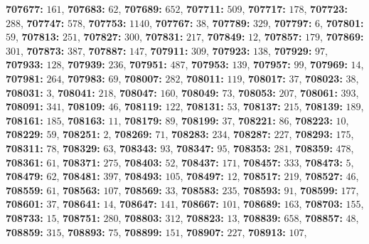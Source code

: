 \textsf{\bfseries 707677:} $161$, \textsf{\bfseries 707683:} $62$, \textsf{\bfseries 707689:} $652$, \textsf{\bfseries 707711:} $509$, \textsf{\bfseries 707717:} $178$, \textsf{\bfseries 707723:} $288$, \textsf{\bfseries 707747:} $578$, \textsf{\bfseries 707753:} $1140$, \textsf{\bfseries 707767:} $38$, \textsf{\bfseries 707789:} $329$, \textsf{\bfseries 707797:} $6$, \textsf{\bfseries 707801:} $59$, \textsf{\bfseries 707813:} $251$, \textsf{\bfseries 707827:} $300$, \textsf{\bfseries 707831:} $217$, \textsf{\bfseries 707849:} $12$, \textsf{\bfseries 707857:} $179$, \textsf{\bfseries 707869:} $301$, \textsf{\bfseries 707873:} $387$, \textsf{\bfseries 707887:} $147$, \textsf{\bfseries 707911:} $309$, \textsf{\bfseries 707923:} $138$, \textsf{\bfseries 707929:} $97$, \textsf{\bfseries 707933:} $128$, \textsf{\bfseries 707939:} $236$, \textsf{\bfseries 707951:} $487$, \textsf{\bfseries 707953:} $139$, \textsf{\bfseries 707957:} $99$, \textsf{\bfseries 707969:} $14$, \textsf{\bfseries 707981:} $264$, \textsf{\bfseries 707983:} $69$, \textsf{\bfseries 708007:} $282$, \textsf{\bfseries 708011:} $119$, \textsf{\bfseries 708017:} $37$, \textsf{\bfseries 708023:} $38$, \textsf{\bfseries 708031:} $3$, \textsf{\bfseries 708041:} $218$, \textsf{\bfseries 708047:} $160$, \textsf{\bfseries 708049:} $73$, \textsf{\bfseries 708053:} $207$, \textsf{\bfseries 708061:} $393$, \textsf{\bfseries 708091:} $341$, \textsf{\bfseries 708109:} $46$, \textsf{\bfseries 708119:} $122$, \textsf{\bfseries 708131:} $53$, \textsf{\bfseries 708137:} $215$, \textsf{\bfseries 708139:} $189$, \textsf{\bfseries 708161:} $185$, \textsf{\bfseries 708163:} $11$, \textsf{\bfseries 708179:} $89$, \textsf{\bfseries 708199:} $37$, \textsf{\bfseries 708221:} $86$, \textsf{\bfseries 708223:} $10$, \textsf{\bfseries 708229:} $59$, \textsf{\bfseries 708251:} $2$, \textsf{\bfseries 708269:} $71$, \textsf{\bfseries 708283:} $234$, \textsf{\bfseries 708287:} $227$, \textsf{\bfseries 708293:} $175$, \textsf{\bfseries 708311:} $78$, \textsf{\bfseries 708329:} $63$, \textsf{\bfseries 708343:} $93$, \textsf{\bfseries 708347:} $95$, \textsf{\bfseries 708353:} $281$, \textsf{\bfseries 708359:} $478$, \textsf{\bfseries 708361:} $61$, \textsf{\bfseries 708371:} $275$, \textsf{\bfseries 708403:} $52$, \textsf{\bfseries 708437:} $171$, \textsf{\bfseries 708457:} $333$, \textsf{\bfseries 708473:} $5$, \textsf{\bfseries 708479:} $62$, \textsf{\bfseries 708481:} $397$, \textsf{\bfseries 708493:} $105$, \textsf{\bfseries 708497:} $12$, \textsf{\bfseries 708517:} $219$, \textsf{\bfseries 708527:} $46$, \textsf{\bfseries 708559:} $61$, \textsf{\bfseries 708563:} $107$, \textsf{\bfseries 708569:} $33$, \textsf{\bfseries 708583:} $235$, \textsf{\bfseries 708593:} $91$, \textsf{\bfseries 708599:} $177$, \textsf{\bfseries 708601:} $37$, \textsf{\bfseries 708641:} $14$, \textsf{\bfseries 708647:} $141$, \textsf{\bfseries 708667:} $101$, \textsf{\bfseries 708689:} $163$, \textsf{\bfseries 708703:} $155$, \textsf{\bfseries 708733:} $15$, \textsf{\bfseries 708751:} $280$, \textsf{\bfseries 708803:} $312$, \textsf{\bfseries 708823:} $13$, \textsf{\bfseries 708839:} $658$, \textsf{\bfseries 708857:} $48$, \textsf{\bfseries 708859:} $315$, \textsf{\bfseries 708893:} $75$, \textsf{\bfseries 708899:} $151$, \textsf{\bfseries 708907:} $227$, \textsf{\bfseries 708913:} $107$, 
